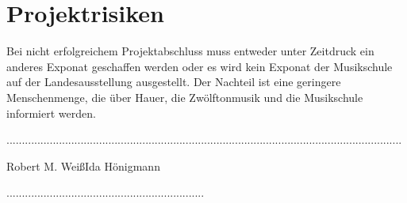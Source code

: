 \documentclass[a4paper]{scrartcl}
\begin{document}
\section{Projektrisiken}
Bei nicht erfolgreichem Projektabschluss muss entweder unter Zeitdruck ein anderes Exponat geschaffen werden oder es wird kein Exponat der Musikschule auf der Landesausstellung ausgestellt. Der Nachteil ist eine geringere Menschenmenge, die über Hauer, die Zwölftonmusik und die Musikschule informiert werden.


\vspace{2cm}................................................................\hspace{2cm}................................................................

Robert M. Weiß\hspace {6cm}Ida Hönigmann

\vspace{1cm}................................................................
\end{document}
